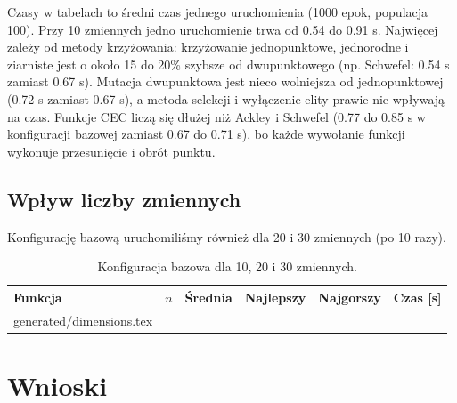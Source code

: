 \documentclass[11pt,a4paper]{article}
\makeatletter
\newcommand{\tabinput}[1]{\@@input #1 }
\makeatother
\begin{document}
Czasy w tabelach to średni czas jednego uruchomienia (1000 epok, populacja 100). Przy 10 zmiennych
jedno uruchomienie trwa od 0.54 do 0.91 s. Najwięcej zależy od metody krzyżowania: krzyżowanie
jednopunktowe, jednorodne i ziarniste jest o około 15 do 20\% szybsze od dwupunktowego
(np. Schwefel: 0.54 s zamiast 0.67 s). Mutacja dwupunktowa jest nieco wolniejsza od jednopunktowej
(0.72 s zamiast 0.67 s), a metoda selekcji i wyłączenie elity prawie nie wpływają na czas.
Funkcje CEC liczą się dłużej niż Ackley i Schwefel (0.77 do 0.85 s w konfiguracji bazowej
zamiast 0.67 do 0.71 s), bo każde wywołanie funkcji wykonuje przesunięcie i obrót punktu.

\subsection{Wpływ liczby zmiennych}

Konfigurację bazową uruchomiliśmy również dla 20 i 30 zmiennych (po 10 razy).

\begin{table}[H]
\centering
\small
\begin{tabular}{lrrrrr}
\toprule
Funkcja & $n$ & Średnia & Najlepszy & Najgorszy & Czas [s] \\
\midrule
\tabinput{generated/dimensions.tex}
\bottomrule
\end{tabular}
\caption{Konfiguracja bazowa dla 10, 20 i 30 zmiennych.}
\end{table}

\section{Wnioski}
\end{document}
